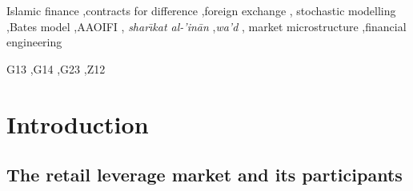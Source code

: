 \documentclass[preprint,12pt,authoryear]{elsarticle}
\theoremstyle{definition}
\begin{document}
\begin{frontmatter}
\begin{abstract}
consistent with published FX and equity implied-volatility studies,
quantifies the fee-structure differential, tail-risk properties, and
margin-call trigger distributions of each architecture against a
conventional leveraged CFD baseline. Because the \emph{shar\={\i}kat}
architecture cannot be leveraged within the joint-ownership
construction adopted, the comparison is properly understood as a
quantification of the economic cost of the leverage cap imposed by
that construction: the compliant architecture forgoes proportional
leveraged upside and leveraged downside relative to a CFD of matched
client capital, while removing the structural concerns identified.
The paper does not issue fiqh rulings; it formalises the mathematical
structure and documents its consistency, or otherwise, with the
adopted constraint framework. Ultimate compliance certification
remains the province of qualified Shariah supervisory boards. An
open-source Python implementation is released with the paper,
together with a full empirical calibration pipeline outlined as
future work.
\end{abstract}

\begin{keyword}
Islamic finance \sep contracts for difference \sep foreign exchange \sep
stochastic modelling \sep Bates model \sep AAOIFI \sep
\emph{shar\={\i}kat al-'in\={a}n} \sep \emph{wa'd} \sep
market microstructure \sep financial engineering

\JEL G13 \sep G14 \sep G23 \sep Z12
\end{keyword}

\end{frontmatter}

\section{Introduction}
\label{sec:introduction}

\subsection{The retail leverage market and its participants}
\label{sec:motivation}
\end{document}
